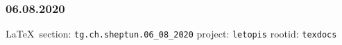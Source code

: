  
 
\subsubsection{06.08.2020}
\label{sec:tg.ch.sheptun.06_08_2020}
  
\vspace{0.5cm}
 {\ifDEBUG\small\LaTeX~section: \verb|tg.ch.sheptun.06_08_2020| project: \verb|letopis| rootid: \verb|texdocs|	\fi}
\vspace{0.5cm}
  

